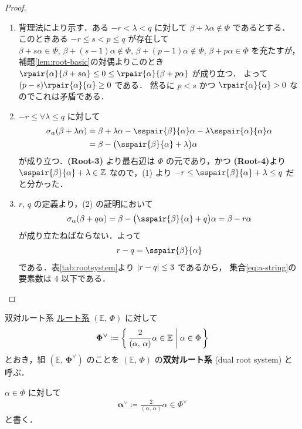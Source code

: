 \documentclass[rep_main]{subfiles}
\begin{document}
\begin{proof}
	\begin{enumerate}
		\item 背理法により示す．ある $-r < \lambda < q$ に対して $\beta + \lambda\alpha \notin \Phi$ であるとする．
		このときある $-r \le s < p \le q$ が存在して $\beta + s\alpha \in \Phi,\, \beta + (s-1)\alpha \notin \Phi,\, \beta + (p-1)\alpha \notin \Phi,\, \beta + p\alpha \in \Phi$ を充たすが，補題\ref{lem:root-basic}の対偶よりこのとき $\rpair{\alpha}{\beta + s\alpha} \le 0 \le \rpair{\alpha}{\beta + p\alpha}$ が成り立つ．
		よって $(p-s) \rpair{\alpha}{\alpha} \ge 0$ である．
		然るに $p < s$ かつ $\rpair{\alpha}{\alpha} > 0$ なのでこれは矛盾である．
		\item $-r \le \forall \lambda \le q$ に対して
		\begin{align}
			\sigma_\alpha(\beta + \lambda\alpha) 
			&= \beta + \lambda\alpha - \sspair{\beta}{\alpha}\alpha - \lambda \sspair{\alpha}{\alpha}\alpha \\
			&= \beta - \bigl( \sspair{\beta}{\alpha} + \lambda \bigr) \alpha
		\end{align}
		が成り立つ．\textsf{\textbf{(Root-3)}} より最右辺は $\Phi$ の元であり，かつ \textsf{\textbf{(Root-4)}}より $\sspair{\beta}{\alpha} + \lambda \in \mathbb{Z}$ なので，(1) より $-r \le \sspair{\beta}{\alpha} + \lambda \le q$ だと分かった．
		\item $r,\, q$ の定義より，(2) の証明において
		\begin{align}
			\sigma_\alpha(\beta + q\alpha) = \beta - \bigl( \sspair{\beta}{\alpha} + q \bigr) \alpha = \beta - r \alpha
		\end{align}
		が成り立たねばならない．よって
		\begin{align}
			r-q = \sspair{\beta}{\alpha}
		\end{align}
		である．表\ref{tab:rootsystem}より $\abs{r-q} \le 3$ であるから， 集合\eqref{eq:a-string}の要素数は $4$ 以下である．
	\end{enumerate}
	
\end{proof}

\begin{mydef}[label=def:dual-root]{双対ルート系}
	\hyperref[ax:root-system]{ルート系} $(\mathbb{E},\, \Phi)$ に対して
	\begin{align}
		\bm{\Phi^{\vee}} \coloneqq \biggl\{\, \frac{2}{(\alpha,\, \alpha)} \alpha \in \mathbb{E} \biggm| \alpha \in \Phi \,\biggr\} 
	\end{align}
	とおき，組 $\bm{(\mathbb{E},\, \Phi^\vee)}$ のことを $(\mathbb{E},\, \Phi)$ の\textbf{双対ルート系} (dual root system) と呼ぶ．
	
	\tcblower
	
	$\alpha \in \Phi$ に対して
	\begin{align}
		\bm{\alpha^\vee} \coloneqq \frac{2}{(\alpha,\, \alpha)} \alpha \in \Phi^\vee
	\end{align}
	と書く．
\end{mydef}
\end{document}
